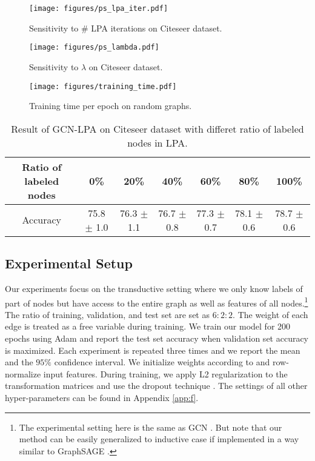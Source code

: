 \documentclass{article}
\begin{document}
		\begin{figure*}[t]
		    \begin{minipage}[t]{0.3\linewidth}
		        \centering 
    			\texttt{[image: figures/ps\_lpa\_iter.pdf]}
    			\caption{Sensitivity to \# LPA iterations on Citeseer dataset.} 
    			\label{fig:ps_lpa_iter}
  			\end{minipage}
  			\hfill
		    \begin{minipage}[t]{0.3\linewidth} 
    			\centering 
    			\texttt{[image: figures/ps\_lambda.pdf]}
    			\caption{Sensitivity to $\lambda$ on Citeseer dataset.} 
    			\label{fig:ps_lambda}
  			\end{minipage}
  			\hfill
  			\begin{minipage}[t]{0.3\linewidth} 
    			\centering 
    			\texttt{[image: figures/training\_time.pdf]}
    			\caption{Training time per epoch on random graphs.} 
    			\label{fig:training_time}
  			\end{minipage}
		\end{figure*}
		
		\begin{table*}[t]
			\centering
			\setlength{\tabcolsep}{8pt}
			\begin{tabular}{c|cccccc}
				\hline
				Ratio of labeled nodes & 0\% & 20\% & 40\% & 60\% & 80\% & 100\% \\
				\hline
				Accuracy & 75.8 $\pm$ 1.0 & 76.3 $\pm$ 1.1 & 76.7 $\pm$ 0.8 & 77.3 $\pm$ 0.7 & 78.1 $\pm$ 0.6 & 78.7 $\pm$ 0.6 \\
				\hline
			\end{tabular}
			\caption{Result of GCN-LPA on Citeseer dataset with differet ratio of labeled nodes in LPA.}
			\label{table:ratio}
		\end{table*}
		
		
	\subsection{Experimental Setup}
		Our experiments focus on the transductive setting where we only know labels of part of nodes but have access to the entire graph as well as features of all nodes.\footnote{The experimental setting here is the same as GCN \citep{kipf2017semi}. But note that our method can be easily generalized to inductive case if implemented in a way similar to GraphSAGE \citep{hamilton2017inductive}.}
		The ratio of training, validation, and test set are set as $6:2:2$.
		The weight of each edge is treated as a free variable during training.
		We train our model for 200 epochs using Adam \citep{kingma2015adam} and report the test set accuracy when validation set accuracy is maximized.
		Each experiment is repeated three times and we report the mean and the $95\%$ confidence interval.
		We initialize weights according to \cite{glorot2010understanding} and row-normalize input features.
		During training, we apply L2 regularization to the transformation matrices and use the dropout technique \citep{nitish2014dropout}.
		The settings of all other hyper-parameters can be found in Appendix \ref{app:f}.
\end{document}

